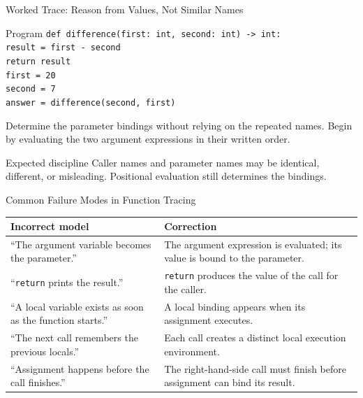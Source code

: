 \documentclass[aspectratio=169,10pt]{beamer}
\begin{document}
\begin{frame}[shrink=8]{Worked Trace: Reason from Values, Not Similar Names}
  \begin{block}{Program}
    \texttt{def difference(first: int, second: int) -> int:}\\
    \hspace*{0.22in}\texttt{result = first - second}\\
    \hspace*{0.22in}\texttt{return result}\\[0.08in]
    \texttt{first = 20}\\
    \texttt{second = 7}\\
    \texttt{answer = difference(second, first)}
  \end{block}

  \begin{activity}
    Determine the parameter bindings without relying on the repeated names. Begin by evaluating the two argument expressions in their written order.
  \end{activity}

  \begin{alertblock}{Expected discipline}
    Caller names and parameter names may be identical, different, or misleading. Positional evaluation still determines the bindings.
  \end{alertblock}
\end{frame}

\begin{frame}{Common Failure Modes in Function Tracing}
  \begin{center}
    \renewcommand{\arraystretch}{1.28}
    \begin{tabular}{p{}|p{}}
      \textbf{Incorrect model} & \textbf{Correction} \\\hline
      ``The argument variable becomes the parameter.'' & The argument expression is evaluated; its value is bound to the parameter. \\
      ``\texttt{return} prints the result.'' & \texttt{return} produces the value of the call for the caller. \\
      ``A local variable exists as soon as the function starts.'' & A local binding appears when its assignment executes. \\
      ``The next call remembers the previous locals.'' & Each call creates a distinct local execution environment. \\
      ``Assignment happens before the call finishes.'' & The right-hand-side call must finish before assignment can bind its result.
    \end{tabular}
  \end{center}
\end{frame}
\end{document}
